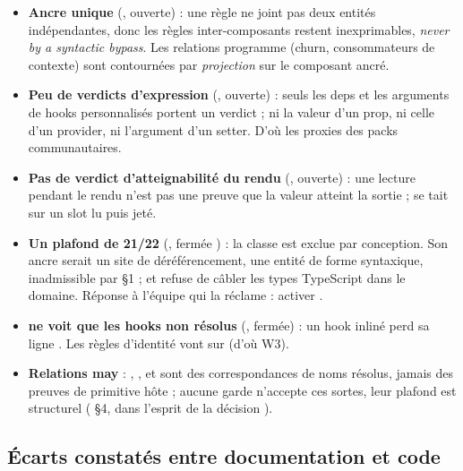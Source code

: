 \begin{itemize}
  \item \textbf{Ancre unique} (, ouverte) : une règle ne joint pas deux entités indépendantes, donc les règles inter-composants restent inexprimables, \og \emph{never by a syntactic bypass}\fg{}. Les relations programme (churn, consommateurs de contexte) sont contournées par \emph{projection} sur le composant ancré.
  \item \textbf{Peu de verdicts d'expression} (, ouverte) : seuls les deps et les arguments de hooks personnalisés portent un verdict ; ni la valeur d'un prop, ni celle d'un provider, ni l'argument d'un setter. D'où les proxies des packs communautaires.
  \item \textbf{Pas de verdict d'atteignabilité du rendu} (, ouverte) : une lecture pendant le rendu n'est pas une preuve que la valeur atteint la sortie ;  se tait sur un slot lu puis jeté.
  \item \textbf{Un plafond de 21/22} (, fermée ) : la classe  est exclue par conception. Son ancre serait un site de déréférencement, une entité de forme syntaxique, inadmissible par  §1 ; et  refuse de câbler les types TypeScript dans le domaine. Réponse à l'équipe qui la réclame : activer .
  \item \textbf{ ne voit que les hooks non résolus} (, fermée) : un hook inliné perd sa ligne . Les règles d'identité vont sur  (d'où W3).
  \item \textbf{Relations may} : , ,  et  sont des correspondances de noms résolus, jamais des preuves de primitive hôte ; aucune garde  n'accepte ces sortes, leur plafond \Warning{} est structurel ( §4, dans l'esprit de la décision ).
\end{itemize}

\subsection{Écarts constatés entre documentation et code}

